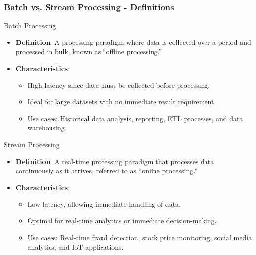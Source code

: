 \documentclass[aspectratio=169]{beamer}
\begin{document}
\begin{frame}[fragile]
    \frametitle{Batch vs. Stream Processing - Definitions}
    \begin{block}{Batch Processing}
        \begin{itemize}
            \item \textbf{Definition}: A processing paradigm where data is collected over a period and processed in bulk, known as “offline processing.”
            \item \textbf{Characteristics}:
                \begin{itemize}
                    \item High latency since data must be collected before processing.
                    \item Ideal for large datasets with no immediate result requirement.
                    \item Use cases: Historical data analysis, reporting, ETL processes, and data warehousing.
                \end{itemize}
        \end{itemize}
    \end{block}
    
    \begin{block}{Stream Processing}
        \begin{itemize}
            \item \textbf{Definition}: A real-time processing paradigm that processes data continuously as it arrives, referred to as “online processing.”
            \item \textbf{Characteristics}:
                \begin{itemize}
                    \item Low latency, allowing immediate handling of data.
                    \item Optimal for real-time analytics or immediate decision-making.
                    \item Use cases: Real-time fraud detection, stock price monitoring, social media analytics, and IoT applications. 
                \end{itemize}
        \end{itemize}
    \end{block}
\end{frame}
\end{document}

